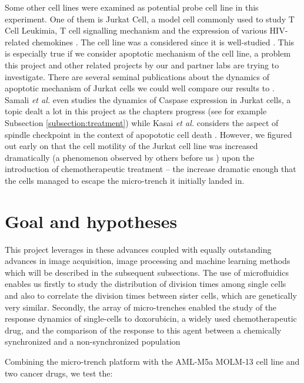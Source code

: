 \documentclass[pdftex,12pt,a4paper]{report}
\begin{document}
Some other cell lines were examined as potential probe cell line in this experiment. One of them is Jurkat Cell, a model cell commonly used to study T Cell Leukimia, T cell signalling mechanism and the expression of various HIV-related chemokines \cite{schneider1977characterization}. The cell line was a considered since it is well-studied \cite{johnson2007genome, schena1996parallel}. This is especially true if we consider apoptotic mechanism of the cell line, a problem this project and other related projects by our  and partner labs are trying to investigate. There are several seminal publications about the dynamics of apoptotic mechanism of Jurkat cells we could well compare our results to \cite{gottlieb1996apoptosis}. Samali \textit{et al.} \cite{samali1999presence} even studies the dynamics of Caspase expression in Jurkat cells, a topic dealt a lot in this project as the chapters progress (see for example Subsection \ref{subsection:treatment}) while Kasai \textit{et al.} considers the aspect of spindle checkpoint in the context of apopototic cell death \cite{kasai2002prevalent}. However, we figured out early on that the cell motility of the Jurkat cell line was increased dramatically (a phenomenon observed by others before us \cite{barnhart2004cd95}) upon the introduction of chemotherapeutic treatment -- the increase dramatic enough that the cells managed to escape the micro-trench it initially landed in.

\section{Goal and hypotheses}

This project leverages in these advances coupled with equally outstanding advances in image acquisition, image processing and machine learning methods which will be described in the subsequent subsections. The use of microfluidics enables us firstly to study the distribution of division times among single cells and also to correlate the division times between sister cells, which are genetically very similar. Secondly, the array of micro-trenches enabled the study of the response dynamics of single-cells to doxorubicin, a widely used chemotherapeutic drug, and the comparison of the response to this agent between a chemically synchronized and a non-synchronized population

Combining the micro-trench platform with the AML-M5a MOLM-13 cell line and two cancer drugs, we test the:
\end{document}
